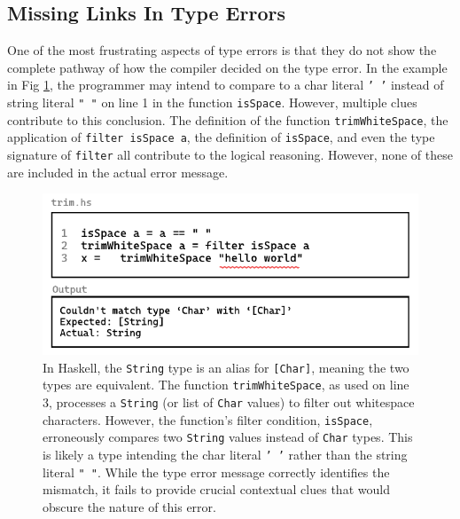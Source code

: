 \subsection*{Missing Links In Type Errors}
\label{subsec:missing-link}

One of the most frustrating aspects of type errors is that they do not show the complete pathway of how the compiler decided on the type error. In the example in Fig \ref{fig:type-error-example-3}, the programmer may intend to compare to a char literal \texttt{' '} instead of string literal \texttt{" "} on line 1 in the function \texttt{isSpace}. However, multiple clues contribute to this conclusion. The definition of the function \texttt{trimWhiteSpace}, the application of \texttt{filter isSpace a}, the definition of \texttt{isSpace}, and even the type signature of \texttt{filter} all contribute to the logical reasoning. However, none of these are included in the actual error message.


\begin{figure}[htbp]
\centering  \includegraphics[width=\linewidth]{TypeErrorExample3}
  \caption[A type error in Haskell involving a type mismatch across multiple functions]{
    \label{fig:type-error-example-3}
    In Haskell, the \texttt{String} type is an alias for \texttt{[Char]}, meaning the two types are equivalent. The function \texttt{trimWhiteSpace}, as used on line 3, processes a \texttt{String} (or list of \texttt{Char} values) to filter out whitespace characters. However, the function’s filter condition, \texttt{isSpace}, erroneously compares two \texttt{String} values instead of \texttt{Char} types. This is likely a type intending the char literal \texttt{' '} rather than the string literal \texttt{" "}. While the type error message correctly identifies the mismatch, it fails to provide crucial contextual clues that would obscure the nature of this error.
    }
\end{figure}


